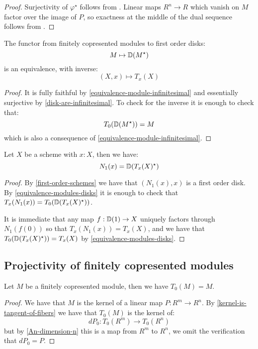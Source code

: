 \begin{proof}
  Surjectivity of $\varphi^\star$ follows from .
  Linear maps $R^n\to R$ which vanish on $M$ factor over the image of $P$, so exactness at the middle of the dual sequence follows from .
\end{proof}

\begin{lemma}\label{equivalence-modules-disks}
  The functor from finitely copresented modules to first order disks:
  \[M\mapsto \mathbb{D}(M^\star)\]
  is an equivalence, with inverse:
  \[(X,x)\mapsto T_x(X)\]
\end{lemma}

\begin{proof}
It is fully faithful by \cref{equivalence-module-infinitesimal} and essentially surjective by \cref{disk-are-infinitesimal}. To check for the inverse it is enough to check that:
\[T_0(\mathbb{D}(M^\star)) = M\]
which is also a consequence of \cref{equivalence-module-infinitesimal}.
\end{proof}

\begin{lemma}\label{duality-infinitesimal-tangent}
Let $X$ be a scheme with $x:X$, then we have:
\[N_1(x) = \mathbb{D}(T_x(X)^\star)\]
\end{lemma}

\begin{proof}
By \cref{first-order-schemes} we have that $(N_1(x),x)$ is a first order disk. By \cref{equivalence-modules-disks} it is enough to check that $T_x(N_1(x)) = T_0(\mathbb{D}(T_x(X)^\star))$. 

It is immediate that any map $f:\mathbb{D}(1)\to X$ uniquely factors through $N_1(f(0))$ so that $T_x(N_1(x)) = T_x(X)$, and we have that $T_0(\mathbb{D}(T_x(X)^\star)) = T_x(X)$ by \cref{equivalence-modules-disks}.
\end{proof}


\subsection{Projectivity of finitely copresented modules}

\begin{lemma}\label{tangent-copresented-modules}
Let $M$ be a finitely copresented module, then we have $T_0(M) = M$.
\end{lemma}

\begin{proof}
We have that $M$ is the kernel of a linear map $P:R^m\to R^n$. By \cref{kernel-is-tangent-of-fibers} we have that $T_0(M)$ is the kernel of:
\[dP_0:T_0(R^m)\to T_0(R^n)\]
but by \cref{An-dimension-n} this is a map from $R^m$ to $R^n$, we omit the verification that $dP_0 = P$.
\end{proof}

